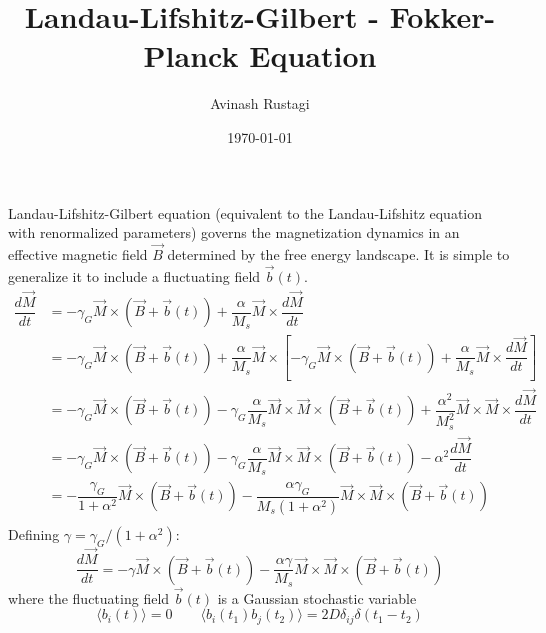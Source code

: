 \documentclass[aps,prb,onecolumn,notitlepage,showpacs,floatfix,superscriptaddress]{revtex4-1}
\begin{document}
\title{Landau-Lifshitz-Gilbert - Fokker-Planck Equation}

\author{Avinash Rustagi}
%
\date{\today}

\maketitle
%
Landau-Lifshitz-Gilbert equation (equivalent to the Landau-Lifshitz equation with renormalized parameters) governs the magnetization dynamics in an effective magnetic field $\vec{B}$ determined by the free energy landscape. It is simple to generalize it to include a fluctuating field $\vec{b}(t)$.
\begin{equation}
\begin{split}
\dfrac{d\vec{M}}{dt} &= -\gamma_G \vec{M} \times (\vec{B}+\vec{b}(t)) +\dfrac{\alpha }{M_s} \vec{M} \times \dfrac{d\vec{M}}{dt} \\
&= -\gamma_G \vec{M} \times (\vec{B}+\vec{b}(t)) +\dfrac{\alpha }{M_s} \vec{M} \times \left[ -\gamma_G \vec{M} \times (\vec{B}+\vec{b}(t)) +\dfrac{\alpha }{M_s} \vec{M} \times \dfrac{d\vec{M}}{dt}\right] \\
&= -\gamma_G \vec{M} \times (\vec{B}+\vec{b}(t)) -\gamma_G \dfrac{\alpha }{M_s} \vec{M} \times \vec{M} \times (\vec{B}+\vec{b}(t)) +\dfrac{\alpha^2 }{M_s^2} \vec{M} \times \vec{M} \times \dfrac{d\vec{M}}{dt} \\
&= -\gamma_G \vec{M} \times (\vec{B}+\vec{b}(t)) -\gamma_G \dfrac{\alpha }{M_s} \vec{M} \times \vec{M} \times (\vec{B}+\vec{b}(t)) -\alpha^2 \dfrac{d\vec{M}}{dt} \\
&= -\dfrac{\gamma_G}{1+\alpha^2} \vec{M} \times (\vec{B}+\vec{b}(t)) - \dfrac{\alpha \gamma_G }{M_s (1+\alpha^2)} \vec{M} \times \vec{M} \times (\vec{B}+\vec{b}(t)) \\
\end{split}
\end{equation}
Defining $\gamma = \gamma_G /(1+\alpha^2)$:
\begin{equation}
\dfrac{d\vec{M}}{dt} = -\gamma \vec{M} \times (\vec{B}+\vec{b}(t)) -\dfrac{\alpha \gamma}{M_s} \vec{M} \times \vec{M} \times (\vec{B}+\vec{b}(t))
\end{equation}
where the fluctuating field $\vec{b}(t)$ is a Gaussian stochastic variable
\begin{equation}
\langle b_i(t) \rangle = 0 \qquad \langle b_i(t_1) b_j(t_2) \rangle = 2 D \delta_{ij} \delta(t_1-t_2)
\end{equation}
\end{document}
